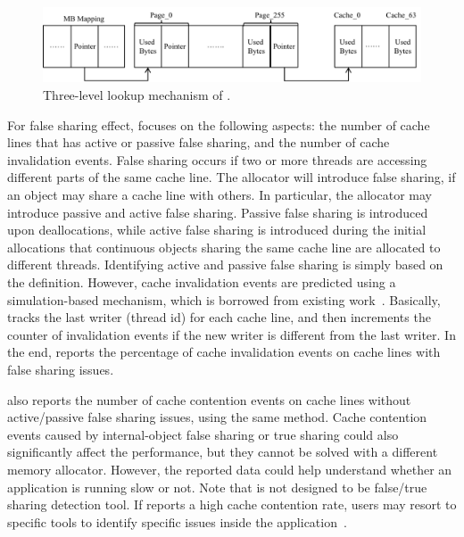           
\begin{figure}[htbp]
\centering
\includegraphics[width=0.9\columnwidth]{figures/lookup}
\caption{Three-level lookup mechanism of \MP{}.\label{fig:lookup}}
\end{figure}


For false sharing effect, \MP{} focuses on the following aspects: the number of cache lines that has active or passive false sharing, and the number of cache invalidation events. False sharing occurs if two or more threads are accessing different parts of the same cache line. The allocator will introduce false sharing, if an object may share a cache line with others. In particular, the allocator may introduce passive and active false sharing. Passive false sharing is introduced upon deallocations, while active false sharing is introduced during the initial allocations that continuous objects sharing the same cache line are allocated to different threads. Identifying active and passive false sharing is simply based on the definition. However, cache invalidation events are predicted using a simulation-based mechanism, which is borrowed from existing work~\cite{Cheetah}. Basically, \MP{} tracks the last writer (thread id) for each cache line, and then increments the counter of invalidation events if the new writer is different from the last writer. 
In the end, \MP{} reports the percentage of cache invalidation events on cache lines with false sharing issues. 

\MP{} also reports the number of cache contention events on cache lines without active/passive false sharing issues, using the same method. Cache contention events caused by internal-object false sharing or true sharing could also significantly affect the performance, but they cannot be solved with a different memory allocator. However, the reported data could help understand whether an application is running slow or not. Note that \MP{} is not designed to be false/true sharing detection tool. If \MP{} reports a high cache contention rate, users may resort to specific tools to identify specific issues inside the application~\cite{Sheriff, Predator, DBLP:conf/ppopp/ChabbiWL18}. 
   

